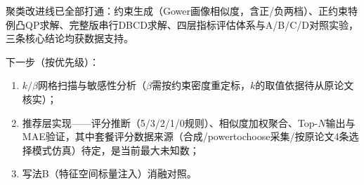 \documentclass[11pt,a4paper]{ctexart}
\begin{document}
	聚类改进线已全部打通：约束生成（Gower画像相似度，含正/负两档）、正约束特例凸QP求解、完整版串行DBCD求解、四层指标评估体系与A/B/C/D对照实验，三条核心结论均获数据支持。
	
	下一步（按优先级）：
	
	\begin{enumerate}[label=(\arabic*)]
		\item $k/\beta$网格扫描与敏感性分析（$\beta$需按约束密度重定标，$k$的取值依据待从原论文核实）；
		\item 推荐层实现——评分推断（5/3/2/1/0规则）、相似度加权聚合、Top-$N$输出与MAE验证，其中套餐评分数据来源（合成/powertochoose采集/按原论文4条选择模式仿真）待定，是当前最大未知数；
		\item 写法B（特征空间标量注入）消融对照。
	\end{enumerate}
	
\end{document}
